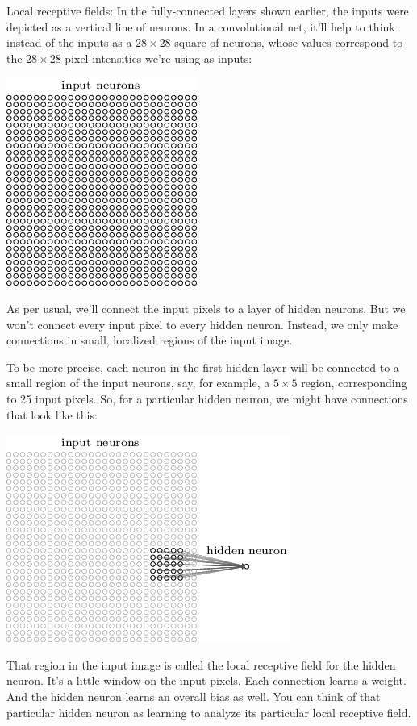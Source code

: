 \documentclass[a4paper,twoside,10pt]{book}
\begin{document}
Local receptive fields: In the fully-connected layers shown earlier, the inputs were depicted as a vertical line of neurons. In a convolutional net, it'll help to think instead of the inputs as a $28\times28$ square of neurons, whose values correspond to the $28\times28$ pixel intensities we're using as inputs:
\begin{center}
	\includegraphics[height=0.3\linewidth]{figures/ch6/tikz42}
\end{center}
As per usual, we'll connect the input pixels to a layer of hidden neurons. But we won't connect every input pixel to every hidden neuron. Instead, we only make connections in small, localized regions of the input image.

To be more precise, each neuron in the first hidden layer will be connected to a small region of the input neurons, say, for example, a $5\times5$ region, corresponding to 25 input pixels. So, for a particular hidden neuron, we might have connections that look like this:
\begin{center}
	\includegraphics[height=0.3\linewidth]{figures/ch6/tikz43}
\end{center}
That region in the input image is called the local receptive field for the hidden neuron. It's a little window on the input pixels. Each connection learns a weight. And the hidden neuron learns an overall bias as well. You can think of that particular hidden neuron as learning to analyze its particular local receptive field.
\end{document}
